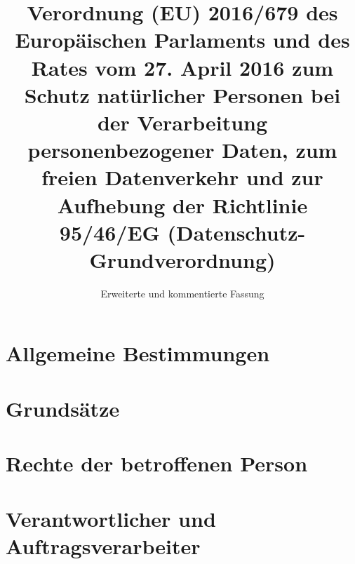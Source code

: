 

\title{Verordnung (EU) 2016/679 des Europäischen Parlaments und des Rates vom 27. April 2016 zum Schutz natürlicher
 Personen bei der Verarbeitung personenbezogener Daten, zum freien Datenverkehr und zur Aufhebung der Richtlinie
 95/46/EG (Datenschutz-Grundverordnung)}
\subtitle{Erweiterte und kommentierte Fassung}


\frontmatter
\maketitle
\tableofcontents



\mainmatter
\part{Allgemeine Bestimmungen}
\label{part:1}





\part{Grundsätze}
\label{part:2}








\part{Rechte der betroffenen Person}
\label{part:3}


















\part{Verantwortlicher und Auftragsverarbeiter}
\label{part:4}


